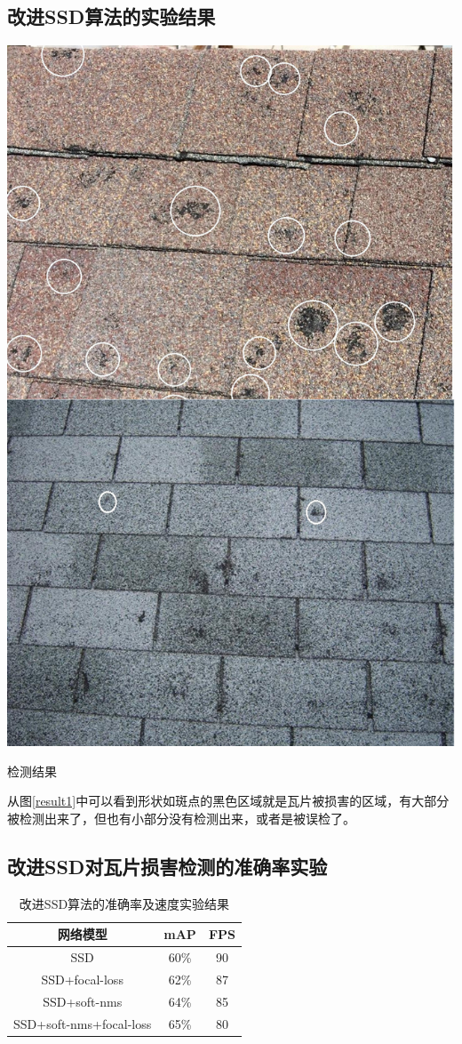 \subsection{改进SSD算法的实验结果}
\begin{uscfigure}
	\includegraphics[width=\textwidth]{./Pictures/result.jpg}	
	\caption{检测结果}
	\label{result1}
\end{uscfigure}

从图\ref{result1}中可以看到形状如斑点的黑色区域就是瓦片被损害的区域，有大部分被检测出来了，但也有小部分没有检测出来，或者是被误检了。
\subsection{改进SSD对瓦片损害检测的准确率实验}
\begin{table}[htbp]
	\centering
	\caption{改进SSD算法的准确率及速度实验结果}
	\label{}
	\begin{tabular}{ccc}
		\toprule
		网络模型 & mAP & FPS\\
		\midrule
		SSD 	& 60\% & 90\\
		SSD+focal-loss  &  62\% & 87\\
		SSD+soft-nms & 64\% & 85 \\
		SSD+soft-nms+focal-loss & 65\% & 80\\
		\bottomrule
	\end{tabular}
\end{table}

